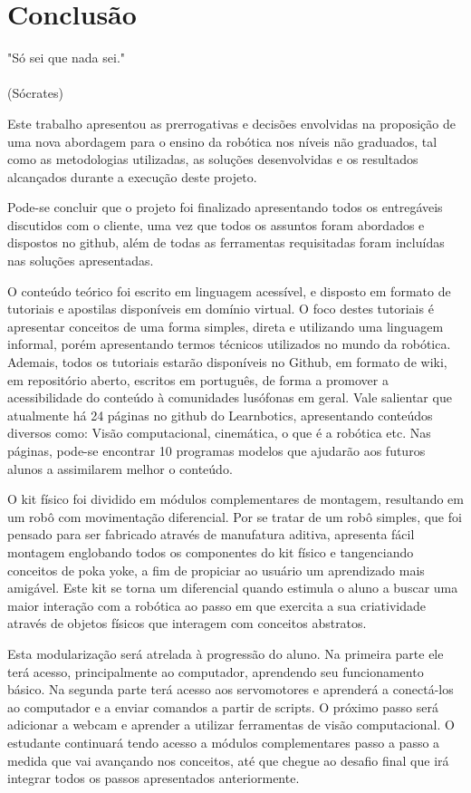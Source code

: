 \chapter{Conclusão}
\label{chap:conc}
\begin{flushright}
	"Só sei que nada sei." \\
	\ \\
	(Sócrates)
\end{flushright}

Este trabalho apresentou as prerrogativas e decisões envolvidas na proposição de uma nova abordagem para o ensino da robótica nos níveis não graduados, tal como as metodologias utilizadas, as soluções desenvolvidas e os resultados alcançados durante a execução deste projeto.

Pode-se concluir que o projeto foi finalizado apresentando todos os entregáveis discutidos com o cliente, uma vez que todos os assuntos foram abordados e dispostos no github, além de todas as ferramentas requisitadas foram incluídas nas soluções apresentadas.

O conteúdo teórico foi escrito em linguagem acessível, e disposto em formato de tutoriais e apostilas disponíveis em domínio virtual. O foco destes tutoriais é apresentar conceitos de uma forma simples, direta e utilizando uma linguagem informal, porém apresentando termos técnicos utilizados no mundo da robótica. Ademais, todos os tutoriais estarão disponíveis no Github, em formato de wiki, em repositório aberto, escritos em português, de forma a promover a acessibilidade do conteúdo à comunidades lusófonas em geral. Vale salientar que atualmente há 24 páginas no github do Learnbotics, apresentando conteúdos diversos como: Visão computacional, cinemática, o que é a robótica etc. Nas páginas, pode-se encontrar 10 programas modelos que ajudarão aos futuros alunos a assimilarem melhor o conteúdo.

O kit físico foi dividido em módulos complementares de montagem, resultando em um robô com movimentação diferencial. Por se tratar de um robô simples, que foi pensado para ser fabricado através de manufatura aditiva, apresenta fácil montagem englobando todos os componentes do kit físico e tangenciando conceitos de poka yoke, a fim de propiciar ao usuário um aprendizado mais amigável. Este kit se torna um diferencial quando estimula o aluno a buscar uma maior interação com a robótica ao passo em que exercita a sua criatividade através de objetos físicos que interagem com conceitos abstratos.

Esta modularização será atrelada à progressão do aluno. Na primeira parte ele terá acesso, principalmente ao computador, aprendendo seu funcionamento básico. Na segunda parte terá acesso aos servomotores e aprenderá a conectá-los ao computador e a enviar comandos a partir de scripts. O próximo passo será adicionar a webcam e aprender a utilizar ferramentas de visão computacional. O estudante continuará tendo acesso a módulos complementares passo a passo a medida que vai avançando nos conceitos, até que chegue ao desafio final que irá integrar todos os passos apresentados anteriormente.

